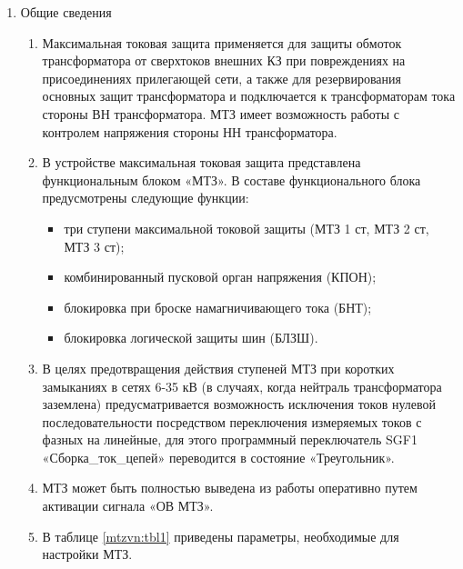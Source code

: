 
\color{black}

\begin{enumerate}

\item Общие сведения

\begin{enumerate}

\item
Максимальная токовая защита применяется для защиты обмоток трансформатора от сверхтоков внешних КЗ при повреждениях на присоединениях прилегающей сети, а также для резервирования основных защит трансформатора и подключается к трансформаторам тока стороны ВН трансформатора. МТЗ имеет возможность работы с контролем напряжения стороны НН трансформатора.

\item
В устройстве максимальная токовая защита представлена функциональным блоком «МТЗ». В составе функционального блока предусмотрены следующие функции:
\begin{itemize}
    \item три ступени максимальной токовой защиты (МТЗ 1 ст, МТЗ 2 ст, МТЗ 3 ст);
    \item комбинированный пусковой орган напряжения (КПОН);
    \item блокировка при броске намагничивающего тока (БНТ);
    \item блокировка логической защиты шин (БЛЗШ).
\end{itemize}

\item
В целях предотвращения действия ступеней МТЗ при коротких замыканиях в сетях 6-35 кВ (в случаях, когда нейтраль трансформатора заземлена) предусматривается возможность  исключения токов нулевой последовательности посредством переключения измеряемых токов с фазных на линейные, для этого программный переключатель SGF1 «Сборка\_ток\_цепей» переводится в состояние «Треугольник».

\item
МТЗ может быть полностью выведена из работы оперативно путем активации сигнала «ОВ МТЗ».
\item
В таблице \ref{mtzvn:tbl1} приведены параметры, необходимые для настройки МТЗ.



\end{enumerate}
\end{enumerate}
